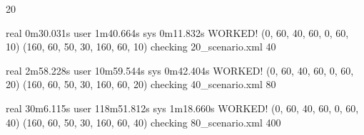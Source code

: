 20

real	0m30.031s
user	1m40.664s
sys	0m11.832s
WORKED! (0, 60, 40, 60, 0, 60, 10) (160, 60, 50, 30, 160, 60, 10) checking 20_scenario.xml
40

real	2m58.228s
user	10m59.544s
sys	0m42.404s
WORKED! (0, 60, 40, 60, 0, 60, 20) (160, 60, 50, 30, 160, 60, 20) checking 40_scenario.xml
80

real	30m6.115s
user	118m51.812s
sys	1m18.660s
WORKED! (0, 60, 40, 60, 0, 60, 40) (160, 60, 50, 30, 160, 60, 40) checking 80_scenario.xml
400
